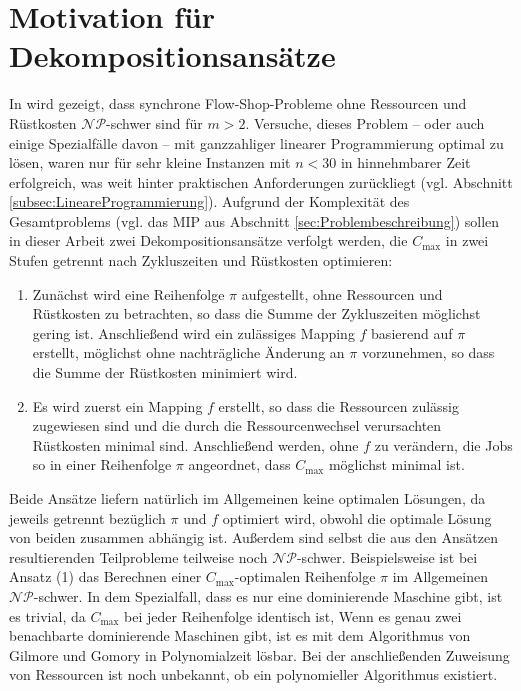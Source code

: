 \documentclass{scrreprt}
\begin{document}
\section{Motivation für Dekompositionsansätze}
In \cite{preprint} wird gezeigt, dass synchrone Flow-Shop-Probleme ohne Ressourcen und Rüstkosten $\mathcal{NP}$-schwer sind für $m>2$.
Versuche, dieses Problem -- oder auch einige Spezialfälle davon -- mit ganzzahliger linearer Programmierung optimal zu lösen, waren nur für sehr kleine Instanzen mit
$n<30$ in hinnehmbarer Zeit erfolgreich, was weit hinter praktischen Anforderungen zurückliegt (vgl. Abschnitt \ref{subsec:LineareProgrammierung}).
Aufgrund der Komplexität des Gesamtproblems (vgl. das MIP aus Abschnitt \ref{sec:Problembeschreibung}) sollen in dieser Arbeit zwei Dekompositionsansätze verfolgt werden,
die $C_{\max}$ in zwei Stufen getrennt nach Zykluszeiten und Rüstkosten optimieren:
\begin{enumerate}
    \item Zunächst wird eine Reihenfolge $\pi$ aufgestellt, ohne Ressourcen und Rüstkosten zu betrachten, so dass die Summe der Zykluszeiten möglichst gering ist.
        Anschließend wird ein zulässiges Mapping $f$ basierend auf $\pi$ erstellt, möglichst ohne nachträgliche Änderung an $\pi$ vorzunehmen,
        so dass die Summe der Rüstkosten minimiert wird.
    \item Es wird zuerst ein Mapping $f$ erstellt, so dass die Ressourcen zulässig zugewiesen sind und die durch die Ressourcenwechsel verursachten Rüstkosten minimal sind.
        Anschließend werden, ohne $f$ zu verändern, die Jobs so in einer Reihenfolge $\pi$ angeordnet, dass $C_{\max}$ möglichst minimal ist.
\end{enumerate}%
Beide Ansätze liefern natürlich im Allgemeinen keine optimalen Lösungen, da jeweils getrennt bezüglich $\pi$ und $f$ optimiert wird,
obwohl die optimale Lösung von beiden zusammen abhängig ist.
Außerdem sind selbst die aus den Ansätzen resultierenden Teilprobleme teilweise noch $\mathcal{NP}$-schwer.
Beispielsweise ist bei Ansatz (1) das Berechnen einer $C_{\max}$-optimalen Reihenfolge $\pi$ im Allgemeinen $\mathcal{NP}$-schwer. 
In dem Spezialfall, dass es nur eine dominierende Maschine gibt, ist es trivial, da $C_{\max}$ bei jeder Reihenfolge identisch ist,
Wenn es genau zwei benachbarte dominierende Maschinen gibt,
ist es mit dem Algorithmus von Gilmore und Gomory \cite{gg} in Polynomialzeit lösbar.
Bei der anschließenden Zuweisung von Ressourcen ist noch unbekannt, ob ein polynomieller Algorithmus existiert.
\end{document}
